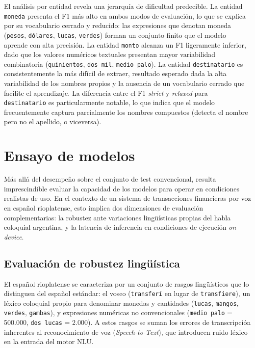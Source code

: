 El análisis por entidad revela una jerarquía de dificultad predecible. La entidad \texttt{moneda} presenta el F1 más alto en ambos modos de evaluación,
lo que se explica por su vocabulario cerrado y reducido: las expresiones que denotan moneda (\texttt{pesos}, \texttt{dólares}, \texttt{lucas}, \texttt{verdes}) forman un
conjunto finito que el modelo aprende con alta precisión. La entidad \texttt{monto} alcanza un F1 ligeramente inferior, dado que los valores
numéricos textuales presentan mayor variabilidad combinatoria (\texttt{quinientos}, \texttt{dos mil}, \texttt{medio palo}). La entidad \texttt{destinatario} es
consistentemente la más difícil de extraer, resultado esperado dada la alta variabilidad de los nombres propios y la ausencia de un vocabulario cerrado
que facilite el aprendizaje. La diferencia entre el F1 \textit{strict} y \textit{relaxed} para \texttt{destinatario} es particularmente notable,
lo que indica que el modelo frecuentemente captura parcialmente los nombres compuestos (detecta el nombre pero no el apellido, o viceversa).

\section{Ensayo de modelos}
\label{sec:ensayo}

Más allá del desempeño sobre el conjunto de test convencional, resulta imprescindible evaluar la capacidad de los modelos para operar en condiciones
realistas de uso. En el contexto de un sistema de transacciones financieras por voz en español rioplatense, esto implica dos dimensiones de evaluación
complementarias: la robustez ante variaciones lingüísticas propias del habla coloquial argentina, y la latencia de inferencia en condiciones de ejecución
\textit{on-device}.

\subsection{Evaluación de robustez lingüística}
\label{subsec:robustez}

El español rioplatense se caracteriza por un conjunto de rasgos lingüísticos que lo distinguen del español estándar: el voseo (\texttt{transferí} en lugar de
\texttt{transfiere}), un léxico coloquial propio para denominar monedas y cantidades (\texttt{lucas}, \texttt{mangos}, \texttt{verdes}, \texttt{gambas}), y expresiones numéricas no
convencionales (\texttt{medio palo} = 500.000, \texttt{dos lucas} = 2.000). A estos rasgos se suman los errores de transcripción inherentes al reconocimiento de
voz (\textit{Speech-to-Text}), que introducen ruido léxico en la entrada del motor NLU.

